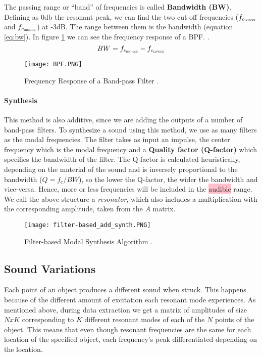 The passing range or ``band'' of frequencies is called \textbf{Bandwidth (BW)}. Defining as 0db the resonant peak, we can find the two cut-off frequencies ($f_{c{_\textsc{lower}}}$ and $f_{c_{\textsc{higher}}}$) at -3dB. The range between them is the bandwidth (equation \ref{eq:bw}). In figure \ref{fig:resp_bpf} we can see the frequency response of a BPF. \cite{bib:bpf}. 
\begin{equation}\label{eq:bw}
BW = f_{c_{\textsc{higher}}}-f_{c_{\textsc{lower}}}
\end{equation}   

\begin{figure}[H]
  \centering
    \texttt{[image: BPF.PNG]}
      \caption{Frequency Response of a Band-pass Filter  \cite{bib:bpf}.}
      \label{fig:resp_bpf}
\end{figure}

\paragraph{Synthesis\\}\label{par:synth}

This method is also additive, since we are adding the outputs of a number of band-pass filters. To synthesize a sound using this method, we use as many filters as the modal frequencies. The filter takes as input an impulse, the center frequency which is the modal frequency and a \textbf{Quality factor (Q-factor)} which specifies the bandwidth of the filter. The Q-factor is calculated heuristically, depending on the material of the sound and is inversely proportional to the bandwidth ($Q=f_c/BW$), so the lower the Q-factor, the wider the bandwidth and vice-versa. Hence, more or less frequencies will be included in the \colorbox{pink}{audible} range. We call the above structure a \textit{resonator}, which also includes a multiplication with the corresponding amplitude, taken from the $A$ matrix.

\begin{figure}[H]
  \centering
    \texttt{[image: filter-based\_add\_synth.PNG]}
      \caption{Filter-based Modal Synthesis Algorithm \cite{Cook:2002:RSS:515316}.}
      \label{fig:filter_synth}
\end{figure}

\subsection{Sound Variations} \label{sec:sound_variation}
Each point of an object produces a different sound when struck. This happens because of the different amount of excitation each resonant mode experiences. As mentioned above, during data extraction we get a matrix of amplitudes of size $NxK$ corresponding to $K$ different resonant modes of each of the $N$ points of the object. This means that even though resonant frequencies are the same for each location of the specified object, each frequency's peak differentiated depending on the location.

